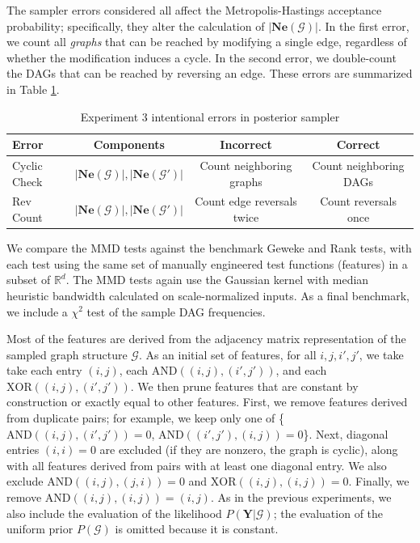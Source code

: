 \documentclass[a4paper,12pt]{article}
\begin{document}
The sampler errors considered all affect the Metropolis-Hastings acceptance probability; specifically, they alter the calculation of $|\mathbf{Ne}(\mathcal{G})|$. In the first error, we count all \textit{graphs} that can be reached by modifying a single edge, regardless of whether the modification induces a cycle. In the second error, we double-count the DAGs that can be reached by reversing an edge. These errors are summarized in Table \ref{tab:ex3_errors}.

\begin{table}
    \centering
    \begin{tabular}{l|c|c|c}
          Error & Components & Incorrect & Correct \\
         \hline
         Cyclic Check & $|\mathbf{Ne}(\mathcal{G})|, |\mathbf{Ne}(\mathcal{G}')|$ & Count neighboring graphs & Count neighboring DAGs \\
         Rev Count & $|\mathbf{Ne}(\mathcal{G})|, |\mathbf{Ne}(\mathcal{G}')|$ & Count edge reversals twice & Count reversals once \\
    \end{tabular}
    \caption{Experiment 3 intentional errors in posterior sampler}
    \label{tab:ex3_errors}
\end{table}

We compare the MMD tests against the benchmark Geweke and Rank tests, with each test using the same set of manually engineered test functions (features) in a subset of $\mathbb{R}^{d}$. The MMD tests again use the Gaussian kernel with median heuristic bandwidth calculated on scale-normalized inputs. As a final benchmark, we include a $\chi^{2}$ test of the sample DAG frequencies. 

Most of the features are derived from the adjacency matrix representation of the sampled graph structure $\mathcal{G}$. As an initial set of features, for all $i,j,i',j'$, we take
take each entry $(i,j)$, each $\mathrm{AND}((i,j),(i',j'))$, and each $\mathrm{XOR}((i,j),(i',j'))$. We then prune features that are constant by construction or exactly equal to other features. First, we remove features derived from duplicate pairs; for example, we keep only one of \{$\mathrm{AND}((i,j),(i',j'))=0$, $\mathrm{AND}((i',j'),(i,j))=0$\}. Next, diagonal entries $(i,i)=0$ are excluded (if they are nonzero, the graph is cyclic), along with all features derived from pairs with at least one diagonal entry. We also exclude $\mathrm{AND}((i,j),(j,i))=0$ and $\mathrm{XOR}((i,j),(i,j))=0$. Finally, we remove $\mathrm{AND}((i,j),(i,j)) = (i,j)$. As in the previous experiments, we also include the evaluation of the likelihood $P(\mathbf{Y}|\mathcal{G})$; the evaluation of the uniform prior $P(\mathcal{G})$ is omitted because it is constant.
\end{document}
